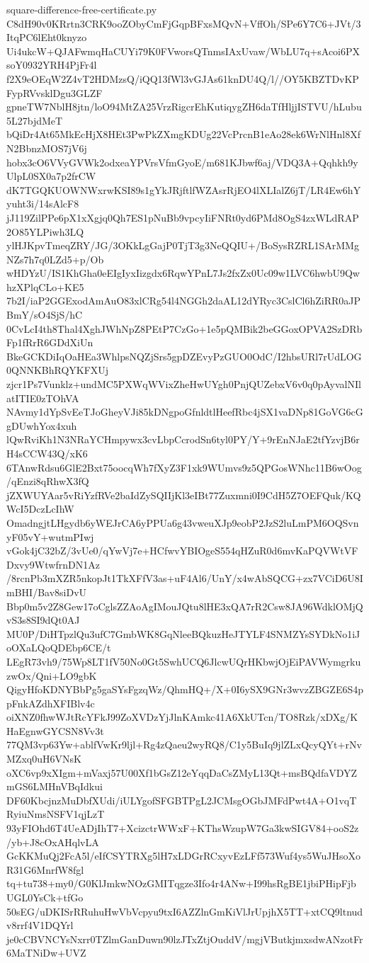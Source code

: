 \documentclass[11pt]{article}
\theoremstyle{definition}
\theoremstyle{remark}
\begin{document}
\begin{filecontents*}[overwrite]{square-difference-free-certificate.py}
C8dH90v0KRrtn3CRK9ooZObyCmFjGqpBFxsMQvN+VffOh/SPe6Y7C6+JVt/3ItqPC6lEht0knyzo
Ui4ukcW+QJAFwmqHaCUYi79K0FVworsQTnmsIAxUvaw/WbLU7q+sAcoi6PXsoY0932YRH4PjFr4l
f2X9eOEqW2Z4vT2HDMzsQ/iQQ13fWl3vGJAs61knDU4Q/l//OY5KBZTDvKPFypRVvsklDgu3GLZF
gpneTW7NblH8jtn/loO94MtZA25VrzRigcrEhKutiqygZH6daTfHljjISTVU/hLubu5L27bjdMeT
bQiDr4At65MkEcHjX8HEt3PwPkZXmgKDUg22VcPrcnB1eAo28ek6WrNlHnl8XfN2BbnzMOS7jV6j
hobx3cO6VVyGVWk2odxeaYPVrsVfmGyoE/m681KJbwf6aj/VDQ3A+Qqhkh9yUlpL0SX0a7p2frCW
dK7TGQKUOWNWxrwKSI89s1gYkJRjftlfWZAsrRjEO4lXLIalZ6jT/LR4Ew6hYyuht3i/14sAlcF8
jJ119ZilPPe6pX1xXgjq0Qh7ES1pNuBb9vpcyIiFNRt0yd6PMd8OgS4zxWLdRAP2O85YLPiwh3LQ
ylHJKpvTmeqZRY/JG/3OKkLgGajP0TjT3g3NeQQIU+/BoSysRZRL1SArMMgNZs7h7q0LZd5+p/Ob
wHDYzU/IS1KhGha0eEIgIyxIizgdx6RqwYPnL7Js2fxZx0Uc09w1LVC6hwbU9QwhzXPlqCLo+KE5
7b2I/iaP2GGExodAmAuO83xlCRg54l4NGGh2daAL12dYRyc3CslCl6hZiRR0aJPBmY/sO4SjS/hC
0CvLcI4th8Thal4XghJWhNpZ8PEtP7CzGo+1e5pQMBik2beGGoxOPVA2SzDRbFp1fRrR6GDdXiUn
BkeGCKDiIqOaHEa3WhlpsNQZjSrs5gpDZEvyPzGUO0OdC/I2hbsURl7rUdLOG0QNNKBhRQYKFXUj
zjcr1Ps7Vunklz+undMC5PXWqWVixZheHwUYgh0PnjQUZebxV6v0q0pAyvalNIlatITIE0zTOhVA
NAvmy1dYpSvEeTJoGheyVJi85kDNgpoGfnldtlHeefRbc4jSX1vaDNp81GoVG6cGgDUwhYox4xuh
lQwRviKh1N3NRaYCHmpywx3cvLbpCcrodSn6tyl0PY/Y+9rEnNJaE2tfYzvjB6rH4sCCW43Q/xK6
6TAnwRdsu6GlE2Bxt75oocqWh7fXyZ3F1xk9WUmvs9z5QPGosWNhc11B6wOog/qEnzi8qRhwX3fQ
jZXWUYAar5vRiYzfRVe2baIdZySQIIjKl3eIBt77Zuxmni0I9CdH5Z7OEFQuk/KQWcI5DczLcIhW
OmadngjtLHgydb6yWEJrCA6yPPUa6g43vweuXJp9eobP2JzS2luLmPM6OQSvnyF05vY+wutmPIwj
vGok4jC32bZ/3vUe0/qYwVj7e+HCfwvYBIOgeS554qHZuR0d6mvKaPQVWtVFDxvy9WtwfrnDN1Az
/8rcnPb3mXZR5nkopJt1TkXFfV3as+uF4Al6/UnY/x4wAbSQCG+zx7VCiD6U8ImBHI/Bav8siDvU
Bbp0m5v2Z8Gew17oCglsZZAoAgIMouJQtu8lHE3xQA7rR2Csw8JA96WdklOMjQvS3s8SI9dQt0AJ
MU0P/DiHTpzlQu3ufC7GmbWK8GqNleeBQkuzHeJTYLF4SNMZYsSYDkNo1iJoOXaLQoQDEbp6CE/t
LEgR73vh9/75Wp8LT1fV50No0Gt5SwhUCQ6JlcwUQrHKbwjOjEiPAVWymgrkuzwOx/Qni+LO9gbK
QigyHfoKDNYBbPg5gaSYsFgzqWz/QhmHQ+/X+0I6ySX9GNr3wvzZBGZE6S4ppFnkAZdhXFIBlv4c
oiXNZ0fhwWJtRcYFkJ99ZoXVDzYjJlnKAmkc41A6XkUTcn/TO8Rzk/xDXg/KHaEgnwGYCSN8Vv3t
77QM3vp63Yw+ablfVwKr9ljl+Rg4zQaeu2wyRQ8/C1y5BuIq9jlZLxQcyQYt+rNvMZxq0uH6VNsK
oXC6vp9xXIgm+mVaxj57U00Xf1bGsZ12eYqqDaCsZMyL13Qt+msBQdfaVDYZmGS6LMHnVBqIdkui
DF60KbcjnzMuDbfXUdi/iULYgofSFGBTPgL2JCMsgOGbJMFdPwt4A+O1vqTRyiuNmsNSFV1qjLzT
93yFIOhd6T4UeADjIhT7+XcizctrWWxF+KThsWzupW7Ga3kwSIGV84+ooS2z/yb+J8cOxAHqlvLA
GcKKMuQj2FcA5l/eIfCSYTRXg5lH7xLDGrRCxyvEzLFf573Wuf4ys5WuJHsoXoR31G6MnrfW8fgl
tq+tu738+my0/G0KlJmkwNOzGMITqgze3Ifo4r4ANw+I99hsRgBE1jbiPHipFjbUGL0YsCk+tfGo
50sEG/uDKISrRRuhuHwVbVcpyu9txI6AZZlnGmKiVlJrUpjhX5TT+xtCQ9ltnudv8rrf4V1DQYrl
je0cCBVNCYsNxrr0TZlmGanDuwn90lzJTxZtjOuddV/mgjVButkjmxsdwANzotFr6MaTNiDw+UVZ

\end{filecontents*}
\end{document}
